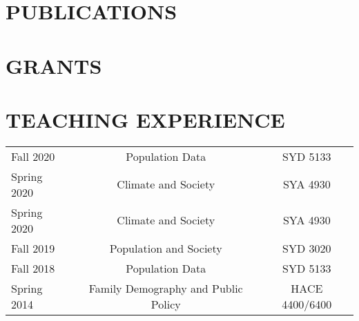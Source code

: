 \documentclass[letterpaper,11pt]{article}
\begin{document}

\section{PUBLICATIONS}



\section{GRANTS}


\section{TEACHING EXPERIENCE}
\begin{tabularx}{\linewidth}{l c c}
\hline
Fall 2020  &  Population Data & SYD 5133\\
Spring 2020 & Climate and Society & SYA 4930 \\
Spring 2020 & Climate and Society & SYA 4930 \\
Fall 2019 & Population and Society & SYD 3020\\
Fall 2018 & Population Data & SYD 5133\\
Spring 2014 & Family Demography and Public Policy & HACE 4400/6400\\
\hline
\end{tabularx}
\end{document}
